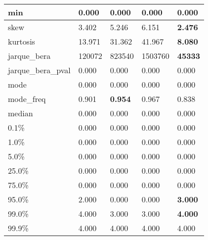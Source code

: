 \begin{table}[H]
\begin{tabular}{|l|m{10em}|m{10em}|m{10em}|m{10em}|}
\hline min & 0.000 & 0.000 & 0.000 & 0.000 \\
\hline skew & 3.402 & 5.246 & \cellcolor[rgb]{0.9, 0.54, 0.52} 6.151 & \bfseries 2.476 \\
\hline kurtosis & 13.971 & 31.362 & \cellcolor[rgb]{0.9, 0.54, 0.52} 41.967 & \bfseries 8.080 \\
\hline jarque\_bera & 120072 & 823540 & \cellcolor[rgb]{0.9, 0.54, 0.52} 1503760 & \bfseries 45333 \\
\hline jarque\_bera\_pval & 0.000 & 0.000 & 0.000 & 0.000 \\
\hline mode & 0.000 & 0.000 & 0.000 & 0.000 \\
\hline mode\_freq & 0.901 & \bfseries 0.954 & \cellcolor[rgb]{0.9, 0.54, 0.52} 0.967 & 0.838 \\
\hline median & 0.000 & 0.000 & 0.000 & 0.000 \\
\hline 0.1\% & 0.000 & 0.000 & 0.000 & 0.000 \\
\hline 1.0\% & 0.000 & 0.000 & 0.000 & 0.000 \\
\hline 5.0\% & 0.000 & 0.000 & 0.000 & 0.000 \\
\hline 25.0\% & 0.000 & 0.000 & 0.000 & 0.000 \\
\hline 75.0\% & 0.000 & 0.000 & 0.000 & 0.000 \\
\hline 95.0\% & 2.000 & \cellcolor[rgb]{0.9, 0.54, 0.52} 0.000 & \cellcolor[rgb]{0.9, 0.54, 0.52} 0.000 & \bfseries 3.000 \\
\hline 99.0\% & 4.000 & \cellcolor[rgb]{0.9, 0.54, 0.52} 3.000 & \cellcolor[rgb]{0.9, 0.54, 0.52} 3.000 & \bfseries 4.000 \\
\hline 99.9\% & 4.000 & 4.000 & 4.000 & 4.000 \\
\hline
\end{tabular}
\end{table}
